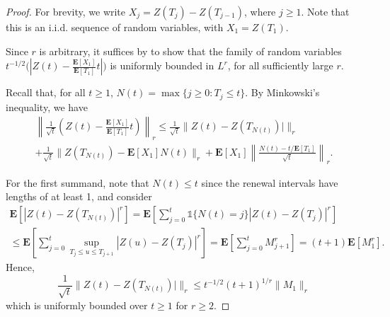 \documentclass[a4paper,11pt,reqno]{amsart}
\newcommand{\paul}[1]{\todo[color=yellow!70,inline]{Paul: #1}}
\newcommand{\fabian}[1]{\todo[color=red!50,inline]{Fabian: #1}}
\newcommand{\bE}{\mathbf{E}}
\theoremstyle{definition}
\begin{document}
%

\begin{proof}
 For brevity, we write $X_j=Z(T_j)-Z(T_{j-1})$, where $j\geq 1$. Note that this is an i.i.d. sequence of random variables, with $X_1=Z(T_1)$.
 
 Since $r$ is arbitrary, it suffices by \cite[Theorem~5.4.1]{Gut13} to show that the family of random variables $t^{-1/2}\big(|Z(t)-\frac{\bE[X_1]}{\bE[T_1]}t|\big)$ is uniformly bounded in $L^r$, for all sufficiently large $r$.  
 
 Recall that, for all $t \geq 1$, $N(t)=\max\{j\geq 0:T_j\leq t\}$. By Minkowski's inequality, we have  
 \begin{multline}\label{eq:SooUIproof}
  \left\|\frac{1}{\sqrt{t}}\left(Z(t)-\frac{\bE[X_1]}{\bE[T_1]}t\right)\right\|_r 
  \leq \frac{1}{\sqrt{t}}\Big\| Z(t)-Z(T_{N(t)})|\Big\|_r \\
   + \frac{1}{\sqrt{t}} \Big\| Z(T_{N(t)}) - \bE[X_1]N(t) \Big\|_r 
   + \bE[X_1]\left\|\frac{N(t)-t/\bE[T_1]}{\sqrt{t}} \right\|_r   . 
 \end{multline}
 
 
 For the first summand, note that $N(t)\leq t$ since the renewal intervals have lengths of at least 1, and consider 
 \begin{multline*}
  \bE\left[\left|Z(t)-Z(T_{N(t)})\right|^r\right] 
  = \bE\left[\sum_{j=0}^t \mathds{1}\{N(t)=j\} \left|Z(t)-Z(T_j)\right|^r \right]\\
  \leq \bE\left[ \sum_{j=0}^t \sup_{T_j\leq u\leq T_{j+1}} \left|Z(u)-Z(T_j)\right| ^r \right]
  = \bE\left[ \sum_{j=0}^t M_{j+1}^r\right] 
  = (t+1) \bE[M_1^r].
 \end{multline*}
 Hence, 
 \[
  \frac{1}{\sqrt{t}}\Big\| Z(t)-Z(T_{N(t)})|\Big\|_r \leq t^{-1/2} (t+1)^{1/r} \|M_1\|_r
 \]
 which is uniformly bounded over $t\geq 1$ for $r\geq 2$. 
 

\end{proof}
\end{document}
